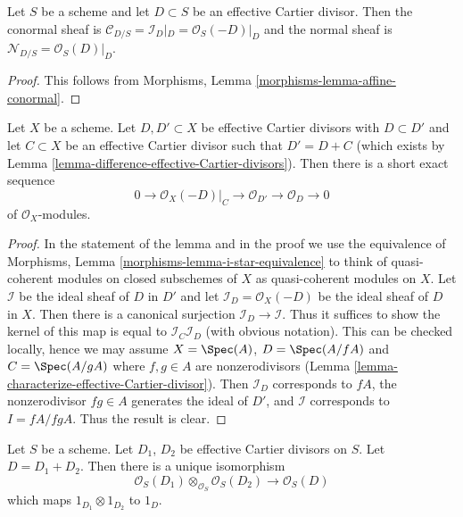 \begin{lemma}
\label{lemma-conormal-effective-Cartier-divisor}
Let $S$ be a scheme and let $D \subset S$ be an effective Cartier divisor.
Then the conormal sheaf is $\mathcal{C}_{D/S} = \mathcal{I}_D|_D =
\mathcal{O}_S(-D)|_D$ and the normal sheaf is
$\mathcal{N}_{D/S} = \mathcal{O}_S(D)|_D$.
\end{lemma}

\begin{proof}
This follows from Morphisms, Lemma \ref{morphisms-lemma-affine-conormal}.
\end{proof}

\begin{lemma}
\label{lemma-ses-add-divisor}
Let $X$ be a scheme. Let $D, D' \subset X$ be effective Cartier divisors
with $D \subset D'$ and let $C \subset X$ be an effective Cartier divisor
such that $D' = D + C$ (which exists by
Lemma \ref{lemma-difference-effective-Cartier-divisors}).
Then there is a short exact sequence
$$
0 \to \mathcal{O}_X(-D)|_C \to \mathcal{O}_{D'} \to \mathcal{O}_D \to 0
$$
of $\mathcal{O}_X$-modules.
\end{lemma}

\begin{proof}
In the statement of the lemma and in the proof we use the equivalence of
Morphisms, Lemma \ref{morphisms-lemma-i-star-equivalence} to think of
quasi-coherent modules on closed subschemes of $X$
as quasi-coherent modules on $X$. Let $\mathcal{I}$ be the ideal
sheaf of $D$ in $D'$ and let $\mathcal{I}_D = \mathcal{O}_X(-D)$ be
the ideal sheaf of $D$ in $X$. Then there is a canonical surjection
$\mathcal{I}_D \to \mathcal{I}$.
Thus it suffices to show the kernel of this map is equal to
$\mathcal{I}_C\mathcal{I}_D$ (with obvious notation).
This can be checked locally, hence we may assume
$X = \Spec(A)$, $D = \Spec(A/fA)$ and $C = \Spec(A/gA)$ where
$f, g \in A$ are nonzerodivisors
(Lemma \ref{lemma-characterize-effective-Cartier-divisor}).
Then $\mathcal{I}_D$ corresponds to $fA$, the nonzerodivisor $fg \in A$
generates the ideal of $D'$, and $\mathcal{I}$ corresponds to $I = fA/fgA$.
Thus the result is clear.
\end{proof}

\begin{lemma}
\label{lemma-invertible-sheaf-sum-effective-Cartier-divisors}
Let $S$ be a scheme.
Let $D_1$, $D_2$ be effective Cartier divisors on $S$.
Let $D = D_1 + D_2$.
Then there is a unique isomorphism
$$
\mathcal{O}_S(D_1) \otimes_{\mathcal{O}_S} \mathcal{O}_S(D_2)
\longrightarrow
\mathcal{O}_S(D)
$$
which maps $1_{D_1} \otimes 1_{D_2}$ to $1_D$.
\end{lemma}

